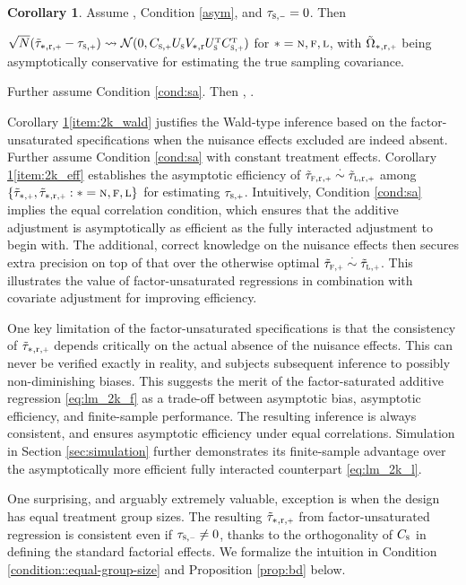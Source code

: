 \documentclass[11pt]{article}
\theoremstyle{definition}
\newtheorem{corollary}{Corollary}
\begin{document}
\begin{corollary}\label{cor:2k}
Assume \cre, Condition \ref{asym}, and $\tsm = 0$.
Then 
\begine[(i)]
\item\label{item:2k_wald} $\sqrt N(\ttsrp  - \tsp) \rs \mathcal N(0, \csp \us  \vsr  \us^\T \csp^\T)$  for $* =\textsc{n}, \textsc{f}, \textsc{l}$, with $\tosrp$  being asymptotically conservative for estimating the true sampling covariance.
\item\label{item:2k_eff} Further assume Condition \ref{cond:sa}. Then  \begina
 \ttfrp \asim \ttlrp  \succi \ttnrp, \qquad 
 \ttfrp \asim \ttlrp  \succi \ttfp  \asim \ttlp \succi \ttnp.
\enda
\ende

\end{corollary}

Corollary \ref{cor:2k}\eqref{item:2k_wald} justifies the Wald-type inference based on the factor-unsaturated specifications when the nuisance effects excluded are indeed absent. 
Further assume Condition \ref{cond:sa} with constant treatment effects. 
Corollary \ref{cor:2k}\eqref{item:2k_eff} establishes the asymptotic efficiency of $\ttfrp \asim \ttlrp$ among $\{\ttsp, \ttsrp: \nfl\}$ for estimating $\tsp$. 
Intuitively, Condition \ref{cond:sa} implies the equal correlation condition, which ensures that the additive adjustment is asymptotically as efficient as the fully interacted adjustment to begin with.
The additional, correct knowledge on the nuisance effects then secures extra precision on top of that over the otherwise optimal $\ttfp \asim \ttlp$. 
 This illustrates the value of factor-unsaturated regressions in combination with covariate adjustment for improving efficiency. 

One key limitation of the factor-unsaturated specifications is that the consistency of  $\ttsrp  $ depends critically on the actual absence of the nuisance effects. 
This can never be verified exactly in reality, and subjects subsequent inference to possibly non-diminishing biases. 
This suggests the merit of the factor-saturated additive regression \eqref{eq:lm_2k_f} as a trade-off between asymptotic bias, asymptotic efficiency, and finite-sample performance. The resulting inference is always consistent, and ensures asymptotic efficiency under equal correlations. Simulation in Section \ref{sec:simulation} further demonstrates its finite-sample advantage over the asymptotically more efficient fully interacted counterpart \eqref{eq:lm_2k_l}.

One surprising, and arguably extremely valuable, exception is when the design has equal treatment group sizes.
The resulting $\ttsrp$ from factor-unsaturated regression is consistent even if $\tsm \neq 0$, thanks to the orthogonality of $C_{\textsc{s}}$ in defining the standard factorial effects. We formalize the intuition in Condition \ref{condition::equal-group-size} and Proposition \ref{prop:bd} below. 
\end{document}
